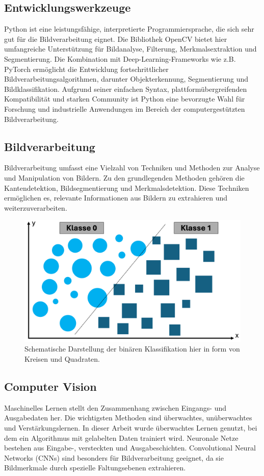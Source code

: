 \documentclass[journal,twoside,web]{ieeecolor}
\begin{document}
\subsection{Entwicklungswerkzeuge}
\label{sec:tools}
Python ist eine leistungsfähige, interpretierte Programmiersprache, die sich sehr gut für die Bildverarbeitung eignet. Die Bibliothek OpenCV bietet hier umfangreiche Unterstützung für Bildanalyse, Filterung, Merkmalsextraktion und Segmentierung. Die Kombination mit Deep-Learning-Frameworks wie z.B. PyTorch ermöglicht die Entwicklung fortschrittlicher Bildverarbeitungsalgorithmen, darunter Objekterkennung, Segmentierung und Bildklassifikation. Aufgrund seiner einfachen Syntax, plattformübergreifenden Kompatibilität und starken Community ist Python eine bevorzugte Wahl für Forschung und industrielle Anwendungen im Bereich der computergestützten Bildverarbeitung.

\subsection{Bildverarbeitung}
\label{sec:image_processing}
Bildverarbeitung umfasst eine Vielzahl von Techniken und Methoden zur Analyse und Manipulation von Bildern. Zu den grundlegenden Methoden gehören die Kantendetektion, Bildsegmentierung und Merkmalsdetektion. Diese Techniken ermöglichen es, relevante Informationen aus Bildern zu extrahieren und weiterzuverarbeiten. 

\begin{figure}[H]
    \centerline{\includegraphics[width=\columnwidth]{binaere_klassifikation.png}}
    \caption{Schematische Darstellung der binären Klassifikation hier in form von Kreisen und Quadraten.}
    \label{fig:bin_class}
\end{figure}

\subsection{Computer Vision}
\label{sec:computer_vision} 
Maschinelles Lernen stellt den Zusammenhang zwischen Eingangs- und Ausgabedaten her. Die wichtigsten Methoden sind überwachtes, unüberwachtes und Verstärkungslernen. In dieser Arbeit wurde überwachtes Lernen genutzt, bei dem ein Algorithmus mit gelabelten Daten trainiert wird. Neuronale Netze bestehen aus Eingabe-, versteckten und Ausgabeschichten. Convolutional Neural Networks (CNNs) sind besonders für Bildverarbeitung geeignet, da sie Bildmerkmale durch spezielle Faltungsebenen extrahieren.
\end{document}
